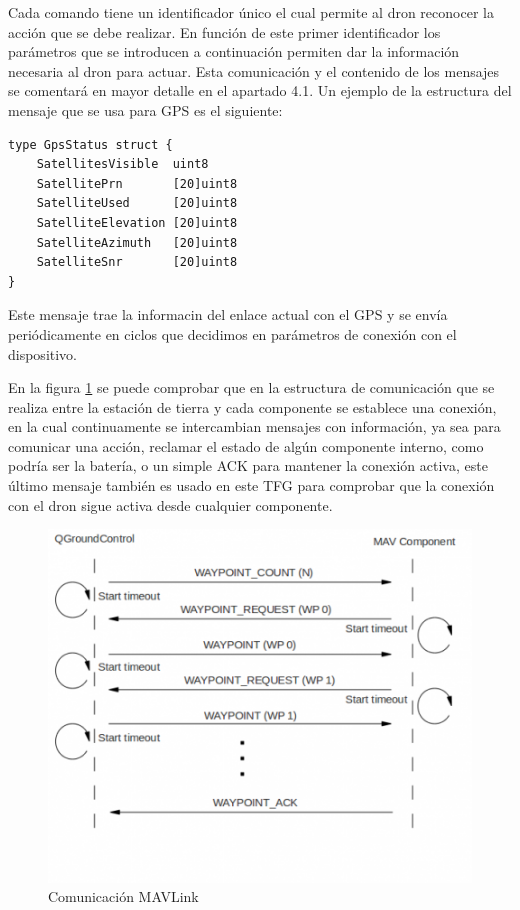 Cada comando tiene un identificador único  el cual permite al dron reconocer la acción que se debe realizar. En función de este primer identificador los parámetros que se introducen a continuación permiten dar la información necesaria al dron para actuar. Esta comunicación y el contenido de los mensajes se comentará en mayor detalle en el apartado 4.1. Un ejemplo de la estructura del mensaje que se usa para GPS es el siguiente:
\begin{lstlisting}[frame=single]
type GpsStatus struct {
    SatellitesVisible  uint8      
    SatellitePrn       [20]uint8  
    SatelliteUsed      [20]uint8  
    SatelliteElevation [20]uint8  
    SatelliteAzimuth   [20]uint8  
    SatelliteSnr       [20]uint8  
}
\end{lstlisting}
Este mensaje trae la informacin del enlace actual con el GPS y se envía periódicamente en ciclos que decidimos en parámetros de conexión con el dispositivo.

En la figura \ref{fig:comunicacionMAVLink} se puede comprobar que en la estructura de comunicación que se realiza entre la estación de tierra y cada componente se establece una conexión, en la cual continuamente se intercambian mensajes con información, ya sea para comunicar una acción, reclamar el estado de algún componente interno, como podría ser la batería, o un simple ACK para mantener la conexión activa, este último mensaje también es usado en este TFG para comprobar que la conexión con el dron sigue activa desde cualquier componente.


\begin{figure}[H]
  \centering
  \includegraphics[scale=0.5]{imagenes/comunicacionMavLink.png}
  \caption{Comunicación MAVLink}
  \label{fig:comunicacionMAVLink}
\end{figure}

